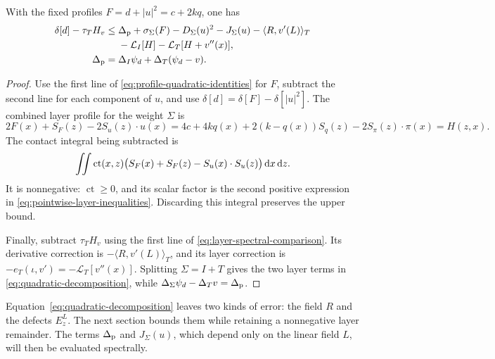 \begin{proposition}\label{prop:quadratic-decomposition}
 With the fixed profiles $F=d+|u|^2=c+2kq$, one has
 \begin{equation}\label{eq:quadratic-decomposition}
 \begin{aligned}
  \delta[d]-\tau_T H_v
  \leq{}&\Delta_{\rm p}+\sigma_\Sigma(F)
       -D_\Sigma(u)^2-J_\Sigma(u)-\langle R,v'(L)\rangle_T\\
       &-\mathcal{L}_I[H]-\mathcal{L}_T[H+v''(x)],\\
  \Delta_{\rm p}
    ={}&\Delta_I\psi_d+\Delta_T(\psi_d-v).
 \end{aligned}
 \end{equation}
\end{proposition}

\begin{proof}
Use the first line of \eqref{eq:profile-quadratic-identities} for $F$, subtract the second line for each component of $u$, and use $\delta[d]=\delta[F]-\delta[|u|^2]$. The combined layer profile for the weight $\Sigma$ is
\[
 2F(x)+S_F(z)-2S_u(z)\cdot u(x)
 =4c+4kq(x)+2(k-q(x))S_q(z)-2S_\pi(z)\cdot\pi(x)
 =H(z,x).
\]
The contact integral being subtracted is
\[
 \iint \operatorname{ct}(x,z)
   \bigl(S_F(x)+S_F(z)-S_u(x)\cdot S_u(z)\bigr)\,\mathrm{d} x\,\mathrm{d} z.
\]
It is nonnegative: $\operatorname{ct}\geq0$, and its scalar factor is the second positive expression in \eqref{eq:pointwise-layer-inequalities}. Discarding this integral preserves the upper bound.

Finally, subtract $\tau_TH_v$ using the first line of \eqref{eq:layer-spectral-comparison}. Its derivative correction is $-\langle R,v'(L)\rangle_T$, and its layer correction is $-e_T(\iota,v')=-\mathcal{L}_T[v''(x)]$. Splitting $\Sigma=I+T$ gives the two layer terms in \eqref{eq:quadratic-decomposition}, while $\Delta_\Sigma\psi_d-\Delta_Tv=\Delta_{\rm p}$.
\end{proof}

Equation~\eqref{eq:quadratic-decomposition} leaves two kinds of error: the field $R$ and the defects $E_z^L$. The next section bounds them while retaining a nonnegative layer remainder. The terms $\Delta_{\rm p}$ and $J_\Sigma(u)$, which depend only on the linear field $L$, will then be evaluated spectrally.
